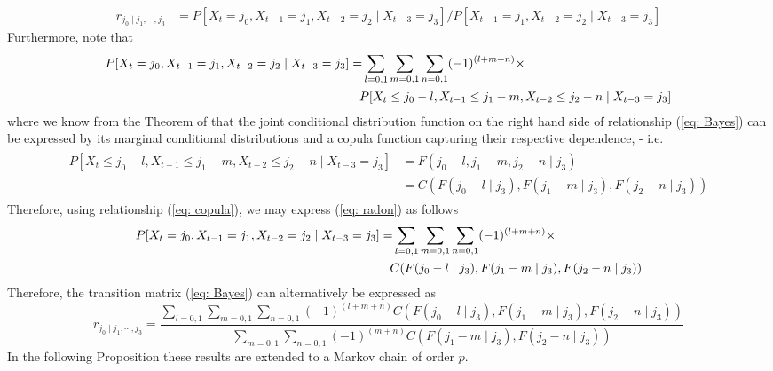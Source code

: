 \documentclass[harvard,11pt]{article}
\begin{document}
\begin{eqnarray}\label{eq: Bayes}
r_{j_0\mid j_1,\cdots,j_3}&=P[X_t=j_0,X_{t-1}=j_1,X_{t-2}=j_2\mid X_{t-3}=j_3]\bigg/P[X_{t-1}=j_1, X_{t-2}=j_2\mid X_{t-3}=j_3]
\end{eqnarray}
Furthermore, note that
\begin{align}\label{eq: radon}
\begin{split}
P[X_t=j_0,X_{t-1}=j_1,X_{t-2}=j_2\mid X_{t-3}=j_3]=&\sum\limits_{l=0,1}\sum\limits_{m=0,1}\sum\limits_{n=0,1}(-1)^{(l+m+n)}\times\\
&\mspace{-\medmuskip}P[X_t\leq j_0-l,X_{t-1}\leq j_1-m,X_{t-2}\leq j_2-n\mid X_{t-3}=j_3]
\end{split}
\end{align}
where we know from the Theorem of \citet{sklar1959fonctions} that the joint conditional distribution function on the right hand side of relationship (\ref{eq: Bayes}) can be expressed by its marginal conditional distributions and a copula function capturing their respective dependence, - i.e. 
\begin{align}\label{eq: copula}
\begin{split}
P[X_t\leq j_0-l,X_{t-1}\leq j_1-m,X_{t-2}\leq j_2-n\mid X_{t-3}=j_3]&=F(j_0-l,j_1-m, j_2-n\mid j_3)\\
&=C(F(j_0-l\mid j_3),F(j_1-m\mid j_3),F(j_2-n\mid j_3))
\end{split}
\end{align}
Therefore, using relationship (\ref{eq: copula}), we may express (\ref{eq: radon}) as follows
\begin{align}\label{eq: radoncopula}
\begin{split}
P[X_t=j_0,X_{t-1}=j_1,X_{t-2}=j_2\mid X_{t-3}=j_3]=&\sum\limits_{l=0,1}\sum\limits_{m=0,1}\sum\limits_{n=0,1}(-1)^{(l+m+n)}\times\\
&\mspace{-\medmuskip} C(F(j_0-l\mid j_3),F(j_1-m\mid j_3),F(j_2-n\mid j_3))
\end{split}
\end{align}
Therefore, the transition matrix (\ref{eq: Bayes}) can alternatively be expressed as 
\begin{equation}
r_{j_0\mid j_1,\cdots,j_3}=\frac{\sum\limits_{l=0,1}\sum\limits_{m=0,1}\sum\limits_{n=0,1}(-1)^{(l+m+n)}C(F(j_0-l\mid j_3),F(j_1-m\mid j_3),F(j_2-n\mid j_3))}{\sum\limits_{m=0,1}\sum\limits_{n=0,1}(-1)^{(m+n)}C(F(j_1-m\mid j_3),F(j_2-n\mid j_3))}
\end{equation}
In the following Proposition these results are extended to a Markov chain of order $p$.
\end{document}
